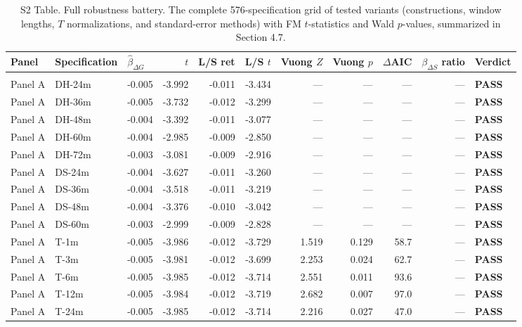 \begin{longtable}{lllrrrrrrrl}
\caption{S2 Table. Full robustness battery. The complete 576-specification grid of tested variants (constructions, window lengths, $T$ normalizations, and standard-error methods) with FM $t$-statistics and Wald $p$-values, summarized in Section 4.7.} \label{tab:robustness} \\
\toprule
Panel & Specification & $\widehat{\beta}_{\Delta G}$ & $t$ & L/S ret & L/S $t$ & Vuong $Z$ & Vuong $p$ & $\Delta$AIC & $\beta_{\Delta S}$ ratio & Verdict \\
\midrule
\endfirsthead
\midrule
\endhead
\midrule
\endfoot
\bottomrule
\endlastfoot
\addlinespace
\multicolumn{11}{l}{\textit{Panel A: Variable Construction Sensitivity}} \\
Panel A & DH-24m & -0.005 & -3.992 & -0.011 & -3.434 & — & — & — & — & \textbf{PASS} \\
Panel A & DH-36m & -0.005 & -3.732 & -0.012 & -3.299 & — & — & — & — & \textbf{PASS} \\
Panel A & DH-48m & -0.004 & -3.392 & -0.011 & -3.077 & — & — & — & — & \textbf{PASS} \\
Panel A & DH-60m & -0.004 & -2.985 & -0.009 & -2.850 & — & — & — & — & \textbf{PASS} \\
Panel A & DH-72m & -0.003 & -3.081 & -0.009 & -2.916 & — & — & — & — & \textbf{PASS} \\
Panel A & DS-24m & -0.004 & -3.627 & -0.011 & -3.260 & — & — & — & — & \textbf{PASS} \\
Panel A & DS-36m & -0.004 & -3.518 & -0.011 & -3.219 & — & — & — & — & \textbf{PASS} \\
Panel A & DS-48m & -0.004 & -3.376 & -0.010 & -3.042 & — & — & — & — & \textbf{PASS} \\
Panel A & DS-60m & -0.003 & -2.999 & -0.009 & -2.828 & — & — & — & — & \textbf{PASS} \\
Panel A & T-1m & -0.005 & -3.986 & -0.012 & -3.729 & 1.519 & 0.129 & 58.7 & — & \textbf{PASS} \\
Panel A & T-3m & -0.005 & -3.981 & -0.012 & -3.699 & 2.253 & 0.024 & 62.7 & — & \textbf{PASS} \\
Panel A & T-6m & -0.005 & -3.985 & -0.012 & -3.714 & 2.551 & 0.011 & 93.6 & — & \textbf{PASS} \\
Panel A & T-12m & -0.005 & -3.984 & -0.012 & -3.719 & 2.682 & 0.007 & 97.0 & — & \textbf{PASS} \\
Panel A & T-24m & -0.005 & -3.985 & -0.012 & -3.714 & 2.216 & 0.027 & 47.0 & — & \textbf{PASS} \\

\end{longtable}
